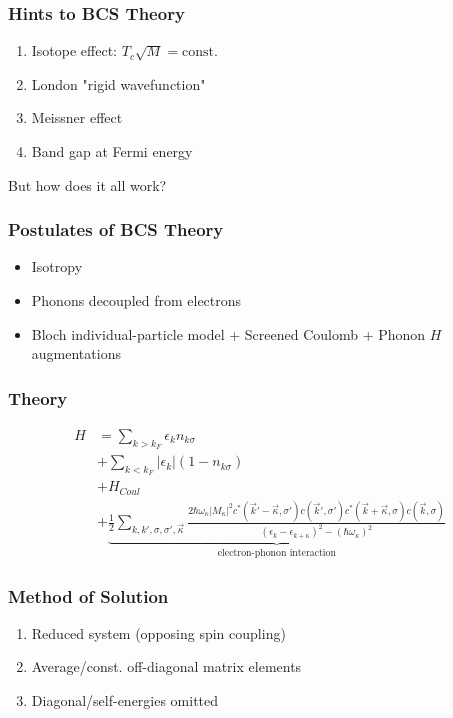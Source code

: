 \documentclass{beamer}
\begin{document}
		\begin{frame}
			\frametitle{Hints to BCS Theory}
			\begin{enumerate}
				\item Isotope effect: $T_{c} \sqrt{M} = \text{const.} $
				\item London "rigid wavefunction"
				\item Meissner effect
				\item Band gap at Fermi energy
			\end{enumerate}
		\centering But how does it all work?
		\end{frame}
		\begin{frame}
			\frametitle{Postulates of BCS Theory}
			\begin{itemize}
				\item Isotropy
				\item Phonons decoupled from electrons
				\item Bloch individual-particle model + Screened Coulomb + Phonon $ H $ augmentations
			\end{itemize}
		\end{frame}
		\begin{frame}
			\frametitle{Theory}
			\begin{align*}
				H &= \sum_{k > k_{F}} \epsilon_{k}n_{k \sigma} \\
				&+ \sum_{k < k_{F}}|\epsilon_{k}|(1-n_{k\sigma})\\
				&+ H_{Coul}	\\
				&+ \underbrace{\frac{1}{2}\sum_{k, k', \sigma, \sigma', \vec{\kappa}} \frac{2 \hbar \omega_{\kappa}|M_{\kappa}|^2c^{*}(\vec{k}'-\vec{\kappa},\sigma')c(\vec{k}',\sigma')c^{*}(\vec{k}+\vec{\kappa},\sigma)c(\vec{k},\sigma)}{(\epsilon_{k}-\epsilon_{k+\kappa})^2-(\hbar \omega_{\kappa})^2}}_{\text{electron-phonon interaction}}
			\end{align*}
		\end{frame}
		\begin{frame}
			\frametitle{Method of Solution}
			\begin{enumerate}
				\item Reduced system (opposing spin coupling)
				\item Average/const. off-diagonal matrix elements
				\item Diagonal/self-energies omitted
			\end{enumerate}
		\end{frame}
\end{document}
